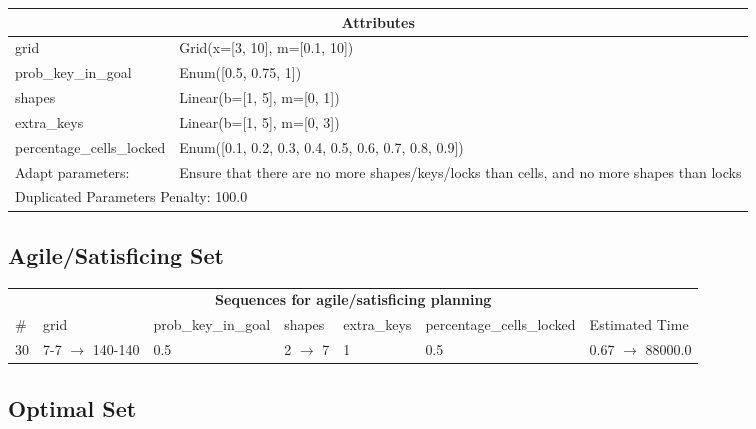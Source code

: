 \documentclass{article}
\begin{document}
                    \begin{center}
                    \begin{tabular}{p{}p{}}
                    \multicolumn{2}{c}{\bf \large Attributes}\\\midrule
                    grid & Grid(x=[3, 10], m=[0.1, 10])\\
prob\_key\_in\_goal & Enum([0.5, 0.75, 1])\\
shapes & Linear(b=[1, 5], m=[0, 1])\\
extra\_keys & Linear(b=[1, 5], m=[0, 3])\\
percentage\_cells\_locked & Enum([0.1, 0.2, 0.3, 0.4, 0.5, 0.6, 0.7, 0.8, 0.9])
                    
                    \\\midrule
                    Adapt parameters: & Ensure that there are no more shapes/keys/locks than cells, and no more shapes than locks
                
                     \\\midrule
                    \multicolumn{2}{l}{Duplicated Parameters Penalty: 100.0}
                    \end{tabular}
                    \end{center}
                
                         \subsection*{Agile/Satisficing Set}

                        \begin{center}
                        \begin{tabular}{l|l|l|l|l|l|l}
                        \multicolumn{7}{c}{\bf \large Sequences for agile/satisficing planning}\\
                        \# & grid & prob\_key\_in\_goal & shapes & extra\_keys & percentage\_cells\_locked & Estimated Time\\\midrule
                        30&7-7 $\rightarrow$ 140-140&0.5&2 $\rightarrow$ 7&1&0.5&0.67 $\rightarrow$ 88000.0
                        \end{tabular}
                        \end{center}
                    
                            \subsection*{Optimal Set}
\end{document}

